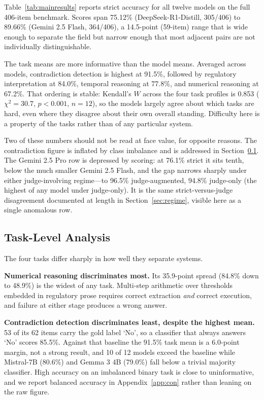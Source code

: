 Table~\ref{tab:mainresults} reports strict accuracy for all twelve models on the full 406-item
benchmark. Scores span 75.12\% (DeepSeek-R1-Distill, 305/406) to 89.66\% (Gemini 2.5 Flash, 364/406),
a 14.5-point (59-item) range
that is wide enough to separate the field but narrow enough that most adjacent pairs are not
individually distinguishable.

The task means are more informative than the model means. Averaged across models, contradiction
detection is highest at 91.5\%, followed by regulatory interpretation at 84.0\%, temporal reasoning
at 77.8\%, and numerical reasoning at 67.2\%. That ordering is stable: Kendall's $W$ across the four
task profiles is 0.853 ($\chi^2 = 30.7$, $p < 0.001$, $n = 12$), so the models largely agree about
which tasks are hard, even where they disagree about their own overall standing. Difficulty here is
a property of the tasks rather than of any particular system.

Two of these numbers should not be read at face value, for opposite reasons. The contradiction
figure is inflated by class imbalance and is addressed in Section~\ref{sec:tasklevel}. The Gemini
2.5 Pro row is depressed by scoring: at 76.1\% strict it sits tenth, below the much smaller Gemini
2.5 Flash, and the gap narrows sharply under either judge-involving regime---to 96.5\% judge-augmented,
94.8\% judge-only (the highest of any model under judge-only). It is the same strict-versus-judge disagreement documented at length in
Section~\ref{sec:regime}, visible here as a single anomalous row.

\subsection{Task-Level Analysis}
\label{sec:tasklevel}

The four tasks differ sharply in how well they separate systems.

\textbf{Numerical reasoning discriminates most.} Its 35.9-point spread (84.8\% down to 48.9\%) is
the widest of any task. Multi-step arithmetic over thresholds embedded in regulatory prose requires
correct extraction \emph{and} correct execution, and failure at either stage produces a wrong
answer.

\textbf{Contradiction detection discriminates least, despite the highest mean.} 53 of its 62 items
carry the gold label `No', so a classifier that always answers `No' scores 85.5\%. Against that
baseline the 91.5\% task mean is a 6.0-point margin, not a strong result, and 10 of 12 models
exceed the baseline while Mistral-7B (80.6\%) and Gemma 3 4B (79.0\%) fall below a trivial
majority classifier. High accuracy on an imbalanced binary task is close to uninformative, and we
report balanced accuracy in Appendix~\ref{app:con} rather than leaning on the raw figure.

